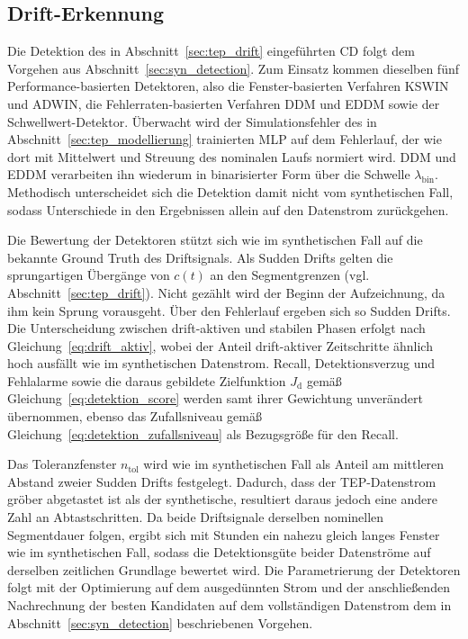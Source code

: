 \subsection{Drift-Erkennung} \label{sec:tep_detection}
%

%
Die Detektion des in Abschnitt~\ref{sec:tep_drift} eingeführten \ac{CD} folgt dem Vorgehen aus Abschnitt~\ref{sec:syn_detection}. Zum Einsatz kommen dieselben fünf Performance-basierten Detektoren, also die Fenster-basierten Verfahren \ac{KSWIN} und \ac{ADWIN}, die Fehlerraten-basierten Verfahren \ac{DDM} und \ac{EDDM} sowie der Schwellwert-Detektor. Überwacht wird der Simulationsfehler des in Abschnitt~\ref{sec:tep_modellierung} trainierten \ac{MLP} auf dem Fehlerlauf, der wie dort mit Mittelwert und Streuung des nominalen Laufs normiert wird. \ac{DDM} und \ac{EDDM} verarbeiten ihn wiederum in binarisierter Form über die Schwelle $\lambda_{\mathrm{bin}}$. Methodisch unterscheidet sich die Detektion damit nicht vom synthetischen Fall, sodass Unterschiede in den Ergebnissen allein auf den Datenstrom zurückgehen. \par
%
Die Bewertung der Detektoren stützt sich wie im synthetischen Fall auf die bekannte Ground Truth des Driftsignals. Als Sudden Drifts gelten die sprungartigen Übergänge von $c(t)$ an den Segmentgrenzen (vgl. Abschnitt~\ref{sec:tep_drift}). Nicht gezählt wird der Beginn der Aufzeichnung, da ihm kein Sprung vorausgeht. Über den Fehlerlauf ergeben sich so \tepdriftNSudden{} Sudden Drifts. Die Unterscheidung zwischen drift-aktiven und stabilen Phasen erfolgt nach Gleichung~\eqref{eq:drift_aktiv}, wobei der Anteil drift-aktiver Zeitschritte ähnlich hoch ausfällt wie im synthetischen Datenstrom. Recall, Detektionsverzug und Fehlalarme sowie die daraus gebildete Zielfunktion $J_{\mathrm{d}}$ gemäß Gleichung~\eqref{eq:detektion_score} werden samt ihrer Gewichtung unverändert übernommen, ebenso das Zufallsniveau gemäß Gleichung~\eqref{eq:detektion_zufallsniveau} als Bezugsgröße für den Recall. \par
%
Das Toleranzfenster $n_{\mathrm{tol}}$ wird wie im synthetischen Fall als Anteil am mittleren Abstand zweier Sudden Drifts festgelegt. Dadurch, dass der \ac{TEP}-Datenstrom gröber abgetastet ist als der synthetische, resultiert daraus jedoch eine andere Zahl an Abtastschritten. Da beide Driftsignale derselben nominellen Segmentdauer folgen, ergibt sich mit \tepdriftToleranceH{} Stunden ein nahezu gleich langes Fenster wie im synthetischen Fall, sodass die Detektionsgüte beider Datenströme auf derselben zeitlichen Grundlage bewertet wird. Die Parametrierung der Detektoren folgt mit der Optimierung auf dem ausgedünnten Strom und der anschließenden Nachrechnung der besten Kandidaten auf dem vollständigen Datenstrom dem in Abschnitt~\ref{sec:syn_detection} beschriebenen Vorgehen. \par

